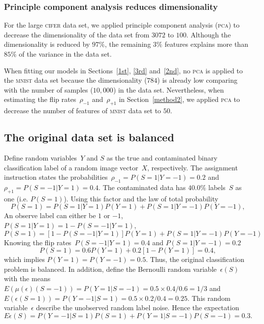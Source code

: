 \documentclass[12pt]{article} %
\newcommand{\rhoo}{\rho_{+1}}
\newcommand{\rhoz}{\rho_{-1}}
\begin{document}
\subsubsection{Principle component analysis reduces dimensionality}
For the large \textsc{cifer} data set, we applied principle component analysis (\textsc{pca}) to decrease the dimensionality of the data set from $3072$ to $100$. Although the dimensionality is reduced by $97\%$, the remaining $3\%$ features explains more than $85\%$ of the variance in the data set.

When fitting our models in Sections~\ref{1st}, \ref{3rd} and~\ref{2nd}, no \textsc{pca} is applied to the \textsc{mnist} data set because the dimensionality ($784$) is already low comparing with the number of samples ($10,000$) in the data set. Nevertheless, when estimating the flip rates~$\rhoz$ and~$\rhoo$ in Section~\ref{method2}, we applied \textsc{pca} to decrease the number of features of \textsc{mnist} data set to $50$.

\subsection{The original data set is balanced} \label{sec:1}
Define random variables~$Y$ and $S$ as the true and contaminated binary classification label of a random image vector~$X$, respectively. The assignment instruction states the probabilities~$\rhoz=P(S=1|Y=-1)=0.2$ and $\rhoo=P(S=-1|Y=1)=0.4$.
The contaminated data has $40.0\%$ labels~$S$ as one (i.e. $P(S=1)$). Using this factor and the law of total probability
\begin{equation*}
P(S=1)=P(S=1|Y=1)P(Y=1)+P(S=1|Y=-1)P(Y=-1),
\end{equation*}
An observe label can either be $1$ or $-1$, $P(S=1|Y=1)=1-P(S=-1|Y=1)$,
\begin{equation*}
P(S=1)=\left[1-P(S=-1|Y=1)\right]P(Y=1)+P(S=1|Y=-1)P(Y=-1)
\end{equation*}
Knowing the flip rates~$P(S=-1|Y=1)=0.4$ and $P(S=1|Y=-1)=0.2$
\begin{equation}
P(S=1)=0.6P(Y=1)+0.2\left[1-P(Y=1)\right]=0.4, \label{eq:ps}
\end{equation}
which implies $P(Y=1)=P(Y=-1)=0.5$. Thus, the original classification problem is balanced.
In addition, define the Bernoulli random variable~$\epsilon(S)$ with the means $E(\mu(\epsilon)(S=-1))=P(Y=1|S=-1)=0.5\times0.4/0.6=1/3$ and $E(\epsilon(S=1))=P(Y=-1|S=1)=0.5\times0.2/0.4=0.25$. This random variable~$\epsilon$ describe the unobserved random label noise. Hence the expectation
\begin{equation}
    E\epsilon(S)=P(Y=-1|S=1)P(S=1)+P(Y=1|S=-1)P(S=-1)
    =0.3.\label{eq:exp}
\end{equation}
\end{document}
